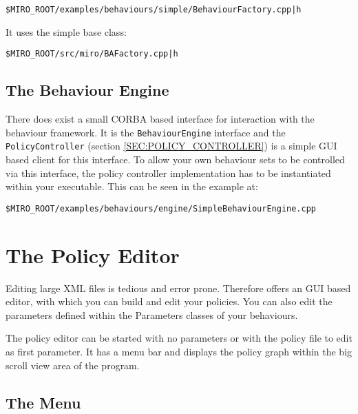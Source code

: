 {\tt \$MIRO\_ROOT/examples/behaviours/simple/BehaviourFactory.cpp|h}

It uses the simple base class:

{\tt \$MIRO\_ROOT/src/miro/BAFactory.cpp|h}

\subsection{The Behaviour Engine}

There does exist a small CORBA based interface for interaction with
the behaviour framework. It is the {\tt BehaviourEngine} interface and
the {\tt PolicyController} (section \ref{SEC:POLICY_CONTROLLER}) is a
simple GUI based client for this interface. To allow your own
behaviour sets to be controlled via this interface, the policy
controller implementation has to be instantiated within your
executable. This can be seen in the example at:

{\tt \$MIRO\_ROOT/examples/behaviours/engine/SimpleBehaviourEngine.cpp}

\section{The Policy Editor}
\label{SEC:POLICY_EDITOR}

Editing large XML files is tedious and error prone. Therefore \miro
offers an GUI based editor, with which you can build and edit your
policies. You can also edit the parameters defined within the
Parameters classes of your behaviours.

The policy editor can be started with no parameters or with the policy
file to edit as first parameter. It has a menu bar and displays the
policy graph within the big scroll view area of the program.

\subsection{The Menu}


